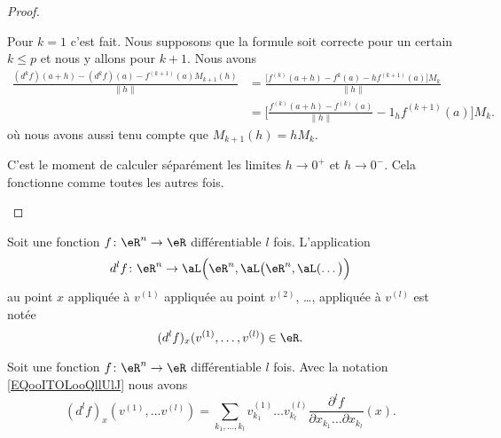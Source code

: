 \begin{proof}
\begin{subproof}
		Pour \( k=1\) c'est fait. Nous supposons que la formule soit correcte pour un certain \( k\leq p\) et nous y allons pour \( k+1\). Nous avons
		\begin{subequations}        \label{SUBEQSooUPLAooQhueCl}
			\begin{align}
				\frac{ (d^kf)(a+h)-(d^kf)(a)-f^{(k+1)}(a)M_{k+1}(h) }{ \| h \| } & =\frac{ \big[ f^{(k)}(a+h)-f^k(a)-hf^{(k+1)}(a) \big]M_k  }{ \| h \| }       \\
				                                                                 & =\big[ \frac{ f^{(k)}(a+h)-f^{(k)}(a) }{ \| h \| }-1_hf^{(k+1)}(a) \big]M_k.
			\end{align}
		\end{subequations}
		où nous avons aussi tenu compte que \( M_{k+1}(h)=hM_k\).

		C'est le moment de calculer séparément les limites \( h\to 0^+\) et \( h\to 0^-\). Cela fonctionne comme toutes les autres fois.
	\end{subproof}
\end{proof}

Soit une fonction \( f\colon \eR^n\to \eR\) différentiable \( l\) fois. L'application
\begin{equation}
	d^lf\colon \eR^n\to \aL\Big( \eR^n,\aL\big( \eR^n,\aL(\ldots \big) \Big)
\end{equation}
au point \( x\) appliquée à \( v^{(1)}\) appliquée au point \( v^{(2)}\), \ldots, appliquée à \( v^{(l)}\) est notée
\begin{equation}        \label{EQooITOLooQllUlJ}
	(d^lf)_x(v^{(1)},\ldots ,v^{(l)})\in \eR.
\end{equation}

\begin{proposition}     \label{PROPooQKZIooXTvkIr}
	Soit une fonction \( f\colon \eR^n\to \eR\) différentiable \( l\) fois. Avec la notation \eqref{EQooITOLooQllUlJ} nous avons
	\begin{equation}
		(d^lf)_x(v^{(1)},\ldots v^{(l)})=\sum_{k_1,\ldots, k_l}v^{(1)}_{k_1}\ldots v_{k_l}^{(l)}\frac{ \partial^lf }{ \partial x_{k_1}\ldots \partial x_{k_l} }(x).
	\end{equation}
\end{proposition}

